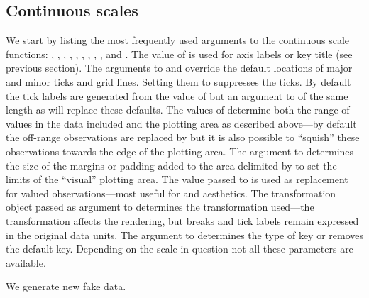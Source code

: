 \documentclass[krantz2]{krantz}\usepackage{knitr}%
\begin{document}
\subsection{Continuous scales}\label{sec:plot:scales:continuous}
We start by listing the most frequently used arguments to the continuous scale functions: , , , , , , , , , and . The value of  is used for axis labels or key title (see previous section). The arguments to  and  override the default locations of major and minor ticks and grid lines. Setting them to  suppresses the ticks. By default the tick labels are generated from the value of  but an argument to  of the same length as  will replace these defaults. The values of  determine both the range of values in the data included and the plotting area as described above---by default the off-range observations are replaced by  but it is also possible to ``squish'' these observations towards the edge of the plotting area. The argument to  determines the size of the margins or padding added to the area delimited by  to set the limits of the ``visual'' plotting area. The value passed to  is used as replacement for  valued observations---most useful for  and  aesthetics. The transformation object passed as argument to  determines the transformation used---the transformation affects the rendering, but breaks and tick labels remain expressed in the original data units. The argument to  determines the type of key or removes the default key. Depending on the scale in question not all these parameters are available.



We generate new fake data.

\begin{knitrout}\footnotesize
{}\color{fgcolor}\begin{kframe}
\begin{alltt}
 \hlkwb{<-}
  \hlstd{(} \hlstd{=} \hlstd{(}\hlstd{(}\hlstd{,}  \hlstd{=} \hlstd{,}  \hlstd{=} \hlstd{),}
                   \hlstd{(}\hlstd{,}  \hlstd{=} \hlstd{,}  \hlstd{=} \hlstd{)),}
              \hlstd{=} \hlstd{(}\hlstd{(}\hlstd{(}\hlstd{,} \hlstd{),} \hlstd{(}\hlstd{,} \hlstd{))),}
              \hlstd{=} \hlstd{(}\hlstd{,}  \hlstd{=} \hlstd{,}  \hlstd{=} \hlstd{))}
\end{alltt}
\end{kframe}
\end{knitrout}
\end{document}
